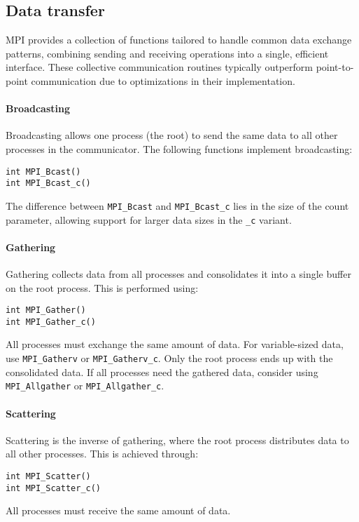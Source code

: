 \subsection{Data transfer}
MPI provides a collection of functions tailored to handle common data exchange patterns, combining sending and receiving operations into a single, efficient interface. 
These collective communication routines typically outperform point-to-point communication due to optimizations in their implementation.

\paragraph*{Broadcasting}
Broadcasting allows one process (the root) to send the same data to all other processes in the communicator. The following functions implement broadcasting:
\begin{lstlisting}[style=C]
int MPI_Bcast()
int MPI_Bcast_c()
\end{lstlisting}
The difference between \texttt{MPI\_Bcast} and \texttt{MPI\_Bcast\_c} lies in the size of the count parameter, allowing support for larger data sizes in the \texttt{\_c} variant.

\paragraph*{Gathering}
Gathering collects data from all processes and consolidates it into a single buffer on the root process.
This is performed using:
\begin{lstlisting}[style=C]
int MPI_Gather()
int MPI_Gather_c()
\end{lstlisting}
All processes must exchange the same amount of data. For variable-sized data, use \texttt{MPI\_Gatherv} or \texttt{MPI\_Gatherv\_c}.
Only the root process ends up with the consolidated data. If all processes need the gathered data, consider using \texttt{MPI\_Allgather} or \texttt{MPI\_Allgather\_c}.

\paragraph*{Scattering}
Scattering is the inverse of gathering, where the root process distributes data to all other processes. 
This is achieved through:
\begin{lstlisting}[style=C]
int MPI_Scatter()
int MPI_Scatter_c()
\end{lstlisting}
All processes must receive the same amount of data. 